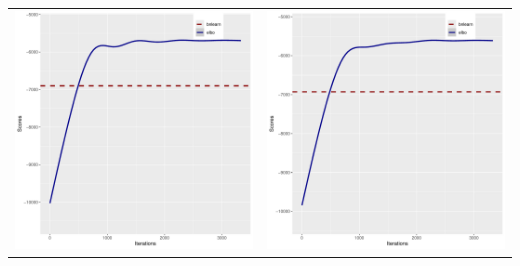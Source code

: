\documentclass[]{scrartcl}
\begin{document}
\begin{tabular}{cc}
\includegraphics[scale = 0.4]{./figs/alarm/mapEvolution-1-3332.pdf} &
\includegraphics[scale = 0.4]{./figs/alarm/mapEvolution-2-3332.pdf} \\
\end{tabular}
\end{document}

